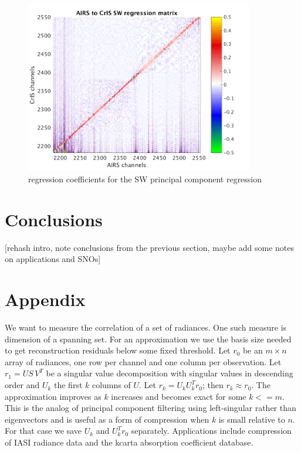 \documentclass[11pt]{article}
\begin{document}
\begin{figure} %
  \centering
  \includegraphics[height=7.5cm]{slackfigs/SW_pc_regr_mat.png}
  \caption{regression coefficients for the SW principal component
    regression}
  \label{dreg9}
\end{figure}

\FloatBarrier
\section{Conclusions}
\label{appcon}

[rehash intro, note conclusions from the previous section, maybe add
  some notes on applications and SNOs]

\FloatBarrier
\section{Appendix}
\label{append}

We want to measure the correlation of a set of radiances.  One such
measure is dimension of a spanning set.  For an approximation we use
the basis size needed to get reconstruction residuals below some
fixed threshold.  Let $r_0$ be an $m \times n$ array of radiances,
one row per channel and one column per observation.  Let $r_1 = U
S\,V^T$ be a singular value decomposition with singular values in
descending order and $U_k$ the first $k$ columns of $U$.  Let $r_k =
U_k U_k^T r_0$; then $r_k \approx r_0$.  The approximation improves
as $k$ increases and becomes exact for some $k <= m$.  This is the
analog of principal component filtering using left-singular rather
than eigenvectors and is useful as a form of compression when $k$ is
small relative to $n$.  For that case we save $U_k$ and $U_k^T r_0$
separately.  Applications include compression of IASI radiance data
and the kcarta absorption coefficient database.
\end{document}

